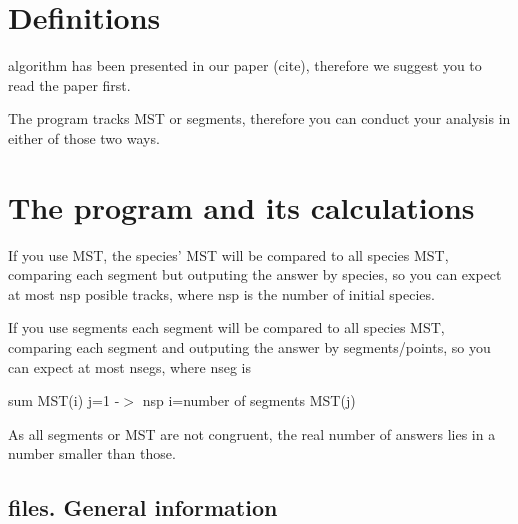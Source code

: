 
\section*{Definitions}

% 
% 


\MT algorithm has been presented in our paper (cite), therefore we suggest you to read the paper first.


The program tracks MST or segments, therefore you can conduct your analysis in either of those two ways.

\vspace{-7\baselineskip}
\vspace{7\baselineskip}




\section*{The program and its calculations}


If you use MST, the species' MST will be compared to all species MST, comparing each segment but outputing the answer by species, so you can expect at most nsp posible tracks, where nsp is the number of initial species.
	

\vspace{-7\baselineskip}
\vspace{7\baselineskip}

If you use segments each segment will be compared to all species MST, comparing each segment and outputing the answer by segments/points, so you can expect at most nsegs, where nseg is
	
	sum MST(i)
		j=1 -$>$ nsp
		i=number of segments MST(j)
		    
		
As all segments or MST are not congruent, the real number of answers lies in a number smaller than those.



\subsection*{\MT files. General information}


